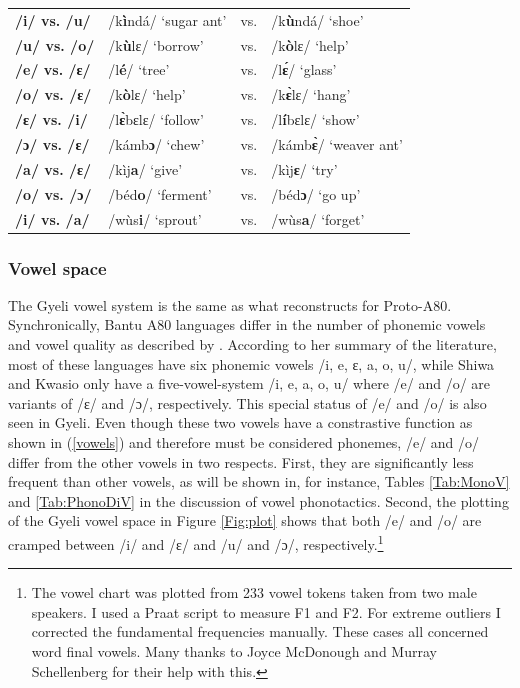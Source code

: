\begin{exe} \ex \label{vowels}
\begin{tabular}{llll}
{\bfseries /i/ vs. /u/} & /k{\bfseries ì}ndá/ `sugar ant' & vs. &  /k{\bfseries ù}ndá/ `shoe' \\
{\bfseries /u/ vs. /o/} &  /k{\bfseries ù}lɛ/ `borrow'  & vs. & /k{\bfseries ò}lɛ/ `help' \\
{\bfseries /e/ vs. /ɛ/} & /l{\bfseries é}/ `tree' & vs. & /l{\bfseries ɛ́}/ `glass' \\
{\bfseries /o/ vs. /ɛ/} & /k{\bfseries ò}lɛ/ `help' & vs. &  /k{\bfseries ɛ̀}lɛ/ `hang' \\
{\bfseries /ɛ/ vs. /i/} & /l{\bfseries ɛ̀}bɛlɛ/ `follow' & vs. & /l{\bfseries í}bɛlɛ/ `show' \\
{\bfseries /ɔ/ vs. /ɛ/} &  /kámb{\bfseries ɔ}/ `chew' & vs. &  /kámb{\bfseries ɛ̀}/ `weaver ant' \\
{\bfseries /a/ vs. /ɛ/} & /kìj{\bfseries a}/ `give' & vs. &  /kìj{\bfseries ɛ}/ `try' \\
{\bfseries /o/ vs. /ɔ/} & /béd{\bfseries o}/ `ferment' & vs. & /béd{\bfseries ɔ}/ `go up' \\
{\bfseries /i/ vs. /a/} & /wùs{\bfseries i}/ `sprout' & vs.  & /wùs{\bfseries a}/ `forget' \\
\end{tabular}
\end{exe}

\subsubsection{Vowel space} 

The Gyeli vowel system is the same as what  \citet[389]{cheucle2014} reconstructs for Proto-A80. Synchronically, Bantu A80 languages differ in the number of phonemic vowels and vowel quality as described by \citet[324]{cheucle2014}. According to her summary of the literature, most of these languages have six phonemic vowels /i, e, ɛ, a, o, u/, while Shiwa and Kwasio only have a five-vowel-system /i, e, a, o, u/ where /e/ and /o/ are variants of /ɛ/ and /ɔ/, respectively. This special status of /e/ and /o/ is also seen in Gyeli. Even though these two vowels have a constrastive function as shown in (\ref{vowels}) and therefore must be considered phonemes, /e/ and /o/ differ from the other vowels in two respects. First, they are significantly less frequent than other vowels, as will be shown in, for instance, Tables \ref{Tab:MonoV} and \ref{Tab:PhonoDiV} in the discussion of vowel phonotactics. Second, the plotting of the Gyeli vowel space in Figure \ref{Fig:plot} shows that both /e/ and /o/ are cramped between /i/ and /ɛ/ and /u/ and /ɔ/, respectively.\footnote{The vowel chart was plotted from 233 vowel tokens taken from two male speakers. I used a Praat script to measure F1 and F2. For extreme outliers I corrected the fundamental frequencies manually. These cases all concerned word final vowels. Many thanks to Joyce McDonough and Murray Schellenberg for their help with this.} 

